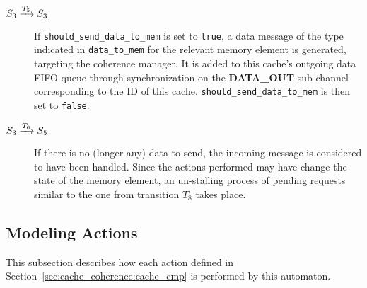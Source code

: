 \begin{description}
\item[$S_3 \xrightarrow[]{T_{5}} S_3$]
   If \lstinline!should_send_data_to_mem! is set to \texttt{true}, a data
   message of the type indicated in \lstinline!data_to_mem! for the relevant
   memory element is generated, targeting the coherence manager. It is added
   to this cache's outgoing data FIFO queue through synchronization on the
   \textbf{DATA\_OUT} sub-channel corresponding to the ID of this cache.
   \lstinline!should_send_data_to_mem! is then set to \texttt{false}.

\item[$S_3 \xrightarrow[]{T_{6}} S_5$]
   If there is no (longer any) data to send, the incoming message is considered
   to have been handled.  Since the actions performed may have change the
   state of the memory element, an un-stalling process of pending requests
   similar to the one from transition $T_8$ takes place.
\end{description}

\subsection{Modeling Actions}
\label{sec:modeling:precise_cache_actions}
This subsection describes how each action defined in
Section~\ref{sec:cache_coherence:cache_cmp} is performed by this automaton.

